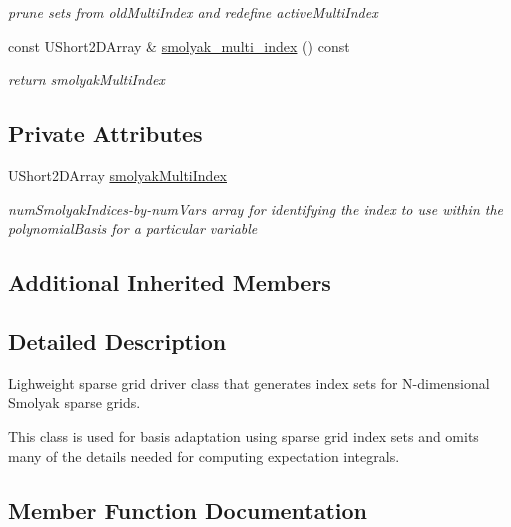 \begin{DoxyCompactItemize}
\begin{DoxyCompactList}\small\item\em prune sets from old\+Multi\+Index and redefine active\+Multi\+Index \end{DoxyCompactList}\item 
const U\+Short2\+D\+Array \& \hyperlink{classPecos_1_1LightweightSparseGridDriver_ac2a92a30d8aedcaf8bcae6097915948d}{smolyak\+\_\+multi\+\_\+index} () const \label{classPecos_1_1LightweightSparseGridDriver_ac2a92a30d8aedcaf8bcae6097915948d}

\begin{DoxyCompactList}\small\item\em return smolyak\+Multi\+Index \end{DoxyCompactList}\end{DoxyCompactItemize}
\subsection*{Private Attributes}
\begin{DoxyCompactItemize}
\item 
U\+Short2\+D\+Array \hyperlink{classPecos_1_1LightweightSparseGridDriver_a189de9f4451d4da64b46cff2b4b1ba0d}{smolyak\+Multi\+Index}
\begin{DoxyCompactList}\small\item\em num\+Smolyak\+Indices-\/by-\/num\+Vars array for identifying the index to use within the polynomial\+Basis for a particular variable \end{DoxyCompactList}\end{DoxyCompactItemize}
\subsection*{Additional Inherited Members}


\subsection{Detailed Description}
Lighweight sparse grid driver class that generates index sets for N-\/dimensional Smolyak sparse grids. 

This class is used for basis adaptation using sparse grid index sets and omits many of the details needed for computing expectation integrals. 

\subsection{Member Function Documentation}
